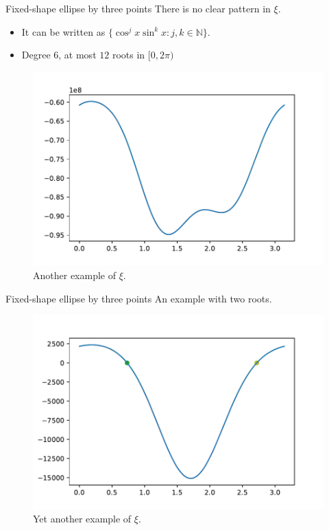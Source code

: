 \documentclass{beamer}
\begin{document}
\begin{frame}{Fixed-shape ellipse by three points}
	There is no clear pattern in $\xi$.
	\begin{itemize}
		\item It can be written as $\{\cos^j{x}\sin^k{x} : j, k \in \mathbb{N}\}$.
		\item Degree $6$, at most $12$ roots in $[0, 2\pi)$ \cite[p.~150]{powell}
	\end{itemize}
\begin{figure}
	\centering
	
	\includegraphics[scale=.5]{035}
	\caption{Another example of $\xi$.}
\end{figure}
\end{frame}

\begin{frame}{Fixed-shape ellipse by three points}
	An example with two roots.
	\begin{figure}
		\centering
		
		\includegraphics[scale=.5]{012}
		\caption{Yet another example of $\xi$.}
	\end{figure}
\end{frame}
\end{document}
